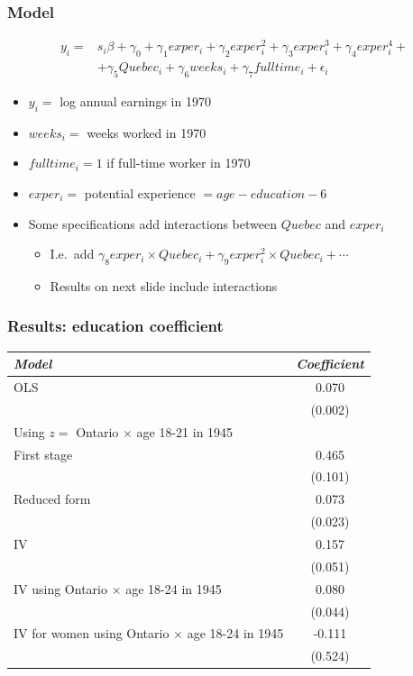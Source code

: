 \begin{frame} 
  \frametitle{Model}
  \begin{align*}
    y_i = & s_i \beta + \gamma_0 + \gamma_1 exper_i + \gamma_2 exper_i^2 +
    \gamma_3 exper_i^3 + \gamma_4 exper_i^4 + \\  & 
    +  \gamma_5 Quebec_i + \gamma_6 weeks_i + \gamma_7 fulltime_i + \epsilon_i
  \end{align*}
  \begin{itemize}
  \item $y_i = $ log annual earnings in 1970
  \item $weeks_i = $ weeks worked in 1970
  \item $fulltime_i = 1 $ if full-time worker in 1970
  \item $exper_i =$ potential experience $ = age -
    education - 6$ 
  \item Some specifications add interactions between $Quebec$ and
    $exper_i$ 
    \begin{itemize}
    \item I.e.\ add $\gamma_8 exper_i \times Quebec_i + \gamma_9 exper_i^2
      \times Quebec_i + \cdots$ 
    \item Results on next slide include interactions
    \end{itemize}
  \end{itemize}
\end{frame}

\begin{frame} \frametitle{Results: education coefficient}
  \begin{tabular}{lc}
    \emph{Model} & \emph{Coefficient} \\
    \hline 
    OLS & 0.070 \\
    & (0.002) \\
    \hline 
    Using $z=$ Ontario $\times$ age 18-21 in 1945 & \\
    First stage & 0.465 \\
    & (0.101) \\
    Reduced form &  0.073 \\
    & (0.023) \\
    IV & 0.157 \\
    & (0.051) \\
    \hline 
    IV using Ontario $\times$ age 18-24 in 1945 & 0.080 \\
    & (0.044) \\
    \hline 
    IV for women using Ontario $\times$ age 18-24 in 1945 & -0.111 \\
    & (0.524) 
  \end{tabular}
\end{frame}

